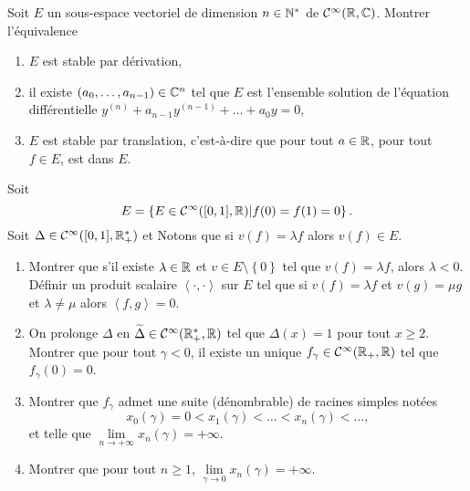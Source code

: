 \documentclass[12pt]{article}
\begin{document}
\begin{exercise}
	Soit $E$ un sous-espace vectoriel de dimension $n\in\mathbb{N}^{*}$ de $\mathcal{C}^{\infty}(\mathbb{R},\mathbb{C})$. Montrer l'équivalence
	\begin{enumerate}[label=(\roman*)]
		\item $E$ est stable par dérivation,
		\item il existe $(a_{0},\dots,a_{n-1})\in\mathbb{C}^{n}$ tel que $E$ est l'ensemble solution de l'équation différentielle $y^{(n)}+a_{n-1}y^{(n-1)}+\dots+a_{0}y=0$,
		\item $E$ est stable par translation, c'est-à-dire que pour tout $a\in\mathbb{R}$, pour tout $f\in E$,  est dans $E$.
	\end{enumerate}
\end{exercise}

\begin{exercise}
	Soit \begin{equation}
		E=\left\lbrace E\in\mathcal{C}^{\infty}([0,1],\mathbb{R})\middle| f(0)=f(1)=0\right\rbrace.
	\end{equation}
	Soit $\Delta\in\mathcal{C}^{\infty}([0,1],\mathbb{R}_{+}^{*})$ et 
	Notons que si $v(f)=\lambda f$ alors $v(f)\in E$.
	\begin{enumerate}
		\item Montrer que s'il existe $\lambda\in\mathbb{R}$ et $v\in E\setminus\left\lbrace 0\right\rbrace$ tel que $v(f)=\lambda f$, alors $\lambda<0$. Définir un produit scalaire $\left\langle\cdot,\cdot\right\rangle$ sur $E$ tel que si $v(f)=\lambda f$ et $v(g)=\mu g$ et $\lambda\neq \mu$ alors $\left\langle f,g\right\rangle=0$.
		\item On prolonge $\Delta$ en $\widetilde{\Delta}\in\mathcal{C}^{\infty}(\mathbb{R}_{+}^{*},\mathbb{R})$ tel que $\Delta(x)=1$ pour tout $x\geqslant2$. Montrer que pour tout $\gamma<0$, il existe un unique $f_{\gamma}\in\mathcal{C}^{\infty}(\mathbb{R}_{+},\mathbb{R})$ tel que $f_{\gamma}(0)=0$.
		\item Montrer que $f_{\gamma}$ admet une suite (dénombrable) de racines simples notées 
		\begin{equation}
			x_{0}(\gamma)=0<x_{1}(\gamma)<\dots<x_{n}(\gamma)<\dots,
		\end{equation}
		et telle que $\lim\limits_{n\to+\infty}x_n(\gamma)=+\infty$.

		\item Montrer que pour tout $n\geqslant1$, $\lim\limits_{\gamma\to0}x_n(\gamma)=+\infty$.
	\end{enumerate}
\end{exercise}
\end{document}
